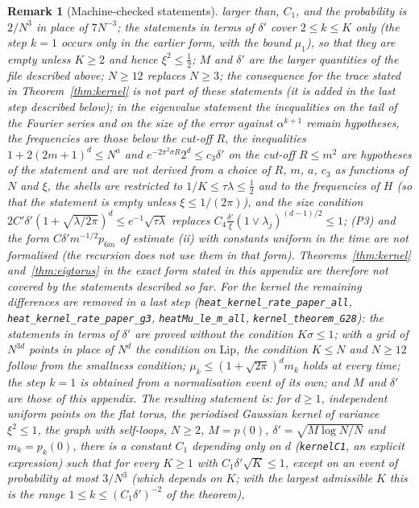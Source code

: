 \documentclass[11pt,a4paper]{article}
\theoremstyle{stmt}
\theoremstyle{defn}
\theoremstyle{rmk}
\newtheorem{remark}[theorem]{Remark}
\numberwithin{equation}{section}
\begin{document}
{\begin{remark}[Machine-checked statements]
larger than, $C_1$, and the probability is $2/N^3$ in place of $7N^{-3}$; the statements in terms of $\delta'$ cover $2\le k\le K$ only (the step $k=1$ occurs only in the earlier form, with the bound $\mu_1$), so that they are empty unless $K\ge2$ and hence $\xi^2\le\frac12$; $M$ and $\delta'$ are the larger quantities of the file described above; $N\ge12$ replaces $N\ge3$; the consequence for the trace stated in Theorem~\ref{thm:kernel} is not part of these statements (it is added in the last step described below); in the eigenvalue statement the inequalities on the tail of the Fourier series and on the size of the error against $\alpha^{k+1}$ remain hypotheses, the frequencies are those below the cut-off $R$, the inequalities $1+2(2m+1)^d\le N^a$ and $e^{-2\pi^2\sigma R}2^d\le c_3\delta'$ on the cut-off $R\le m^2$ are hypotheses of the statement and are not derived from a choice of $R$, $m$, $a$, $c_3$ as functions of $N$ and $\xi$, the shells are restricted to $1/K\le\tau\lambda\le\frac12$ and to the frequencies of $H$ (so that the statement is empty unless $\xi\le1/(2\pi)$), and the size condition $2C'\delta'(1+\sqrt{\lambda/2\pi})^d\le e^{-1}\sqrt{\tau\lambda}$ replaces $C_4\frac{\delta'}\xi(1\vee\lambda_j)^{(d-1)/2}\le1$; (P3) and the form $C\delta'm^{-1/2}p_{6m}$ of estimate (ii) with constants uniform in the time are not formalised (the recursion does not use them in that form). Theorems~\ref{thm:kernel} and~\ref{thm:eigtorus} in the exact form stated in this appendix are therefore not covered by the statements described so far. For the kernel the remaining differences are removed in a last step (\texttt{heat\_kernel\_rate\_paper\_all}, \texttt{heat\_kernel\_rate\_paper\_g3}, \texttt{heatMu\_le\_m\_all}, \texttt{kernel\_theorem\_G28}): the statements in terms of $\delta'$ are proved without the condition $K\sigma\le1$; with a grid of $N^{3d}$ points in place of $N^d$ the condition on $\mathrm{Lip}$, the condition $K\le N$ and $N\ge12$ follow from the smallness condition; $\mu_k\le(1+\sqrt{2\pi})^dm_k$ holds at every time; the step $k=1$ is obtained from a normalisation event of its own; and $M$ and $\delta'$ are those of this appendix. The resulting statement is: for $d\ge1$, independent uniform points on the flat torus, the periodised Gaussian kernel of variance $\xi^2\le1$, the graph with self-loops, $N\ge2$, $M=p(0)$, $\delta'=\sqrt{M\log N/N}$ and $m_k=p_k(0)$, there is a constant $C_1$ depending only on $d$ (\texttt{kernelC1}, an explicit expression) such that for every $K\ge1$ with $C_1\delta'\sqrt K\le1$, except on an event of probability at most $3/N^3$ (which depends on $K$; with the largest admissible $K$ this is the range $1\le k\le(C_1\delta')^{-2}$ of the theorem),

\end{remark}}
\end{document}

